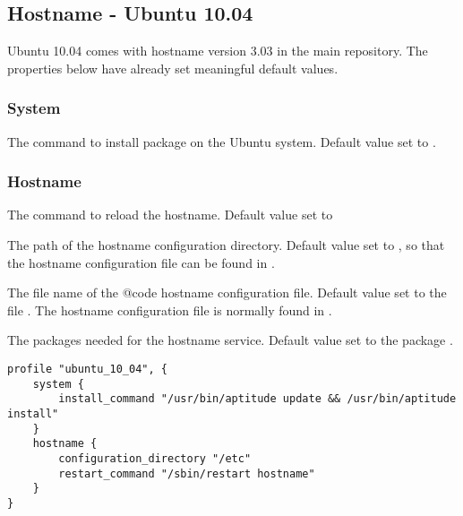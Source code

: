 \subsection{Hostname - Ubuntu 10.04}

Ubuntu 10.04 comes with hostname version 3.03 in the main repository.
The properties below have already set meaningful default values.

\subsubsection*{System}


The command to install package on the Ubuntu system.
Default value set to .

\subsubsection*{Hostname}


The command to reload the hostname.
Default value set to 


The path of the hostname configuration directory.
Default value set to , so that the hostname configuration
file can be found in .


The file name of the {@code hostname} configuration file.
Default value set to the file . The hostname configuration
file is normally found in .


The packages needed for the hostname service.
Default value set to the package .

\begin{lstlisting}[style=Sscontrol,
label={lst:hostname_ubuntu_profile},
title={Ubuntu hostname profile.}]
profile "ubuntu_10_04", {
    system {
        install_command "/usr/bin/aptitude update && /usr/bin/aptitude install"
    }
    hostname {
        configuration_directory "/etc"
        restart_command "/sbin/restart hostname"
    }
}
\end{lstlisting}
